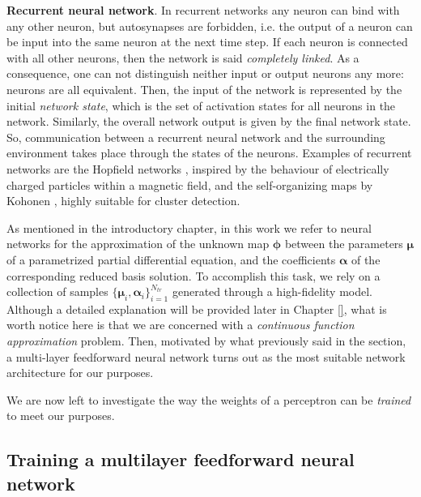 \documentclass[11pt, a4paper]{report}
\numberwithin{equation}{chapter}
\theoremstyle{theorem}
\theoremstyle{definition}
\numberwithin{figure}{section}
\begin{document}
		\noindent \textbf{Recurrent neural network}. In recurrent networks any neuron can bind with any other neuron, but autosynapses are forbidden, i.e. the output of a neuron can be input into the same neuron at the next time step. If each neuron is connected with all other neurons, then the network is said \emph{completely linked}. As a consequence, one can not distinguish neither input or output neurons any more: neurons are all equivalent. Then, the input of the network is represented by the initial \emph{network state}, which is the set of activation states for all neurons in the network. Similarly, the overall network output is given by the final network state. So, communication between a recurrent neural network and the surrounding environment takes place through the states of the neurons. Examples of recurrent networks are the Hopfield networks \cite{}, inspired by the behaviour of electrically charged particles within a magnetic field, and the self-organizing maps by Kohonen \cite{}, highly suitable for cluster detection.
		
		\vspace*{0.3cm}
		
		As mentioned in the introductory chapter, in this work we refer to neural networks for the approximation of the unknown map $\boldsymbol{\phi}$ between the parameters $\boldsymbol{\mu}$ of a parametrized partial differential equation, and the coefficients $\boldsymbol{\alpha}$ of the corresponding reduced basis solution. To accomplish this task, we rely on a collection of samples $\lbrace \boldsymbol{\mu}_i, \boldsymbol{\alpha}_i \rbrace_{i = 1}^{N_{tr}}$ generated through a high-fidelity model. Although a detailed explanation will be provided later in Chapter \ref{}, what is worth notice here is that we are concerned with a \emph{continuous function approximation} problem. Then, motivated by what previously said in the section, a multi-layer feedforward neural network turns out as the most suitable network architecture for our purposes. 
		
		We are now left to investigate the way the weights of a perceptron can be \emph{trained} to meet our purposes.
		
	\subsection{Training a multilayer feedforward neural network}
	\label{section:Training a multilayer feedforard neural network}
	
\end{document}
